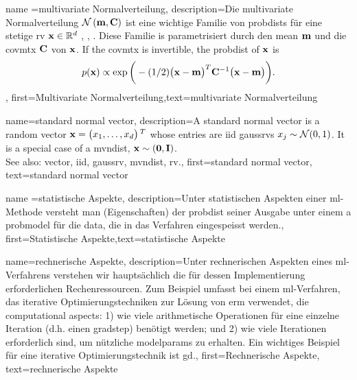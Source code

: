 {{{{{	}

{name ={multivariate Normalverteilung}, 
	description={Die  multivariate Normalverteilung
		$\mathcal{N}\left({\bf m},{\bf C}\right)$ ist eine wichtige Familie von \gls{probdist}s  für eine stetige  \gls{rv} ${\bf x} \in \mathbb{R}^{d}$ \cite{BertsekasProb}, \cite{GrayProbBook}, \cite{Lapidoth09}. 
		Diese Familie is parametrisiert durch den \gls{mean} ${\bf m}$  und die  \gls{covmtx} ${\bf C}$ von ${\bf x}$. 
		If the \gls{covmtx} is invertible, the \gls{probdist} of ${\bf x}$ is 
		$$p({\bf x}) \propto \exp\bigg(-(1/2) \big( {\bf x} - {\bf m} \big)^{T} {\bf C}^{-1} \big( {\bf x} - {\bf m} \big) \bigg).$$},
		 first={Multivariate Normalverteilung},text={multivariate Normalverteilung}}




{name={standard normal vector}, 
	description={A standard normal \gls{vector} is a random 
		\gls{vector} ${\bf x}=\big(x_{1}, \ldots, x_{d}\big)\,^{T}$ 
		whose entries are \gls{iid} \glspl{gaussrv} $x_{j} \sim \mathcal{N}(0,1)$. 
		It is a special case of a \gls{mvndist}, ${\bf x} \sim \mathcal(\mathbf{0},\mathbf{I})$.
		\\ 
		See also: \gls{vector}, \gls{iid}, \gls{gaussrv}, \gls{mvndist}, \gls{rv}.}, 
	first={standard normal vector},
	text={standard normal vector}
}

		 {name ={statistische Aspekte}, 
		 	description={Unter statistischen Aspekten einer  \gls{ml}-Methode versteht man (Eigenschaften) der \gls{probdist}
		 		seiner Ausgabe unter einem a \gls{probmodel} für die  \gls{data}, die in das Verfahren eingespeisst werden.},
		 		first={Statistische Aspekte},text={statistische Aspekte}}

{name={rechnerische Aspekte},
	description={Unter rechnerischen Aspekten  eines \gls{ml}-Verfahrens verstehen wir hauptsächlich die für dessen Implementierung erforderlichen Rechenressourcen. Zum Beispiel umfasst bei einem \gls{ml}-Verfahren, das iterative Optimierungstechniken zur Lösung von \gls{erm} verwendet, die computational aspects: 1) wie viele arithmetische Operationen für eine einzelne Iteration (d.h. einen \gls{gradstep}) benötigt werden; und 2) wie viele Iterationen erforderlich sind, um nützliche \glspl{modelparam} zu erhalten. Ein wichtiges Beispiel für eine iterative Optimierungstechnik ist \gls{gd}.},
	first={Rechnerische Aspekte},
	text={rechnerische Aspekte}
}

}}}}
